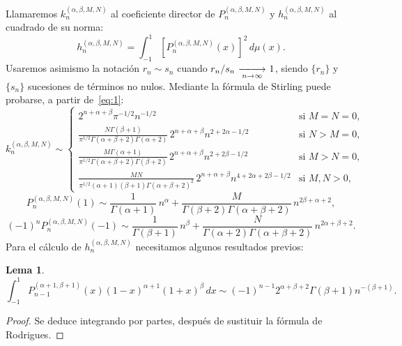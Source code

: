 \documentclass[a4paper]{article}
\newtheorem{lemma}{Lema}
\def\limtoenorme{\mathop{\,\relbar\joinrel\relbar\joinrel%
  \longrightarrow\,}\limits}
\begin{document}
Llamaremos $k^{(\alpha,\beta,M,N)}_{n}$ al 
coeficiente director de $P^{(\alpha,\beta,M,N)}_{n}$ 
y $h^{(\alpha,\beta,M,N)}_{n}$ al cuadrado 
de su norma:
$$
h^{(\alpha,\beta,M,N)}_{n}
= \int_{-1}^{1} [P^{(\alpha,\beta,M,N)}_{n}(x)]^{2}\,d\mu(x).
$$
Usaremos asimismo la notaci\'{o}n $r_{n} \sim s_{n}$ 
cuando $r_{n}/s_{n} \limtoenorme_{n\to\infty} 1$,
siendo $\{r_{n}\}$ y $\{s_{n}\}$ sucesiones de t\'{e}rminos no nulos. 
Mediante la f\'{o}rmula de Stirling puede probarse, a partir de~\eqref{eq:1}:
\begin{equation}
k^{(\alpha,\beta,M,N)}_{n} \sim 
\begin{cases}
2^{n+\alpha+\beta} \pi^{-1/2} n^{-1/2} &\text{si } M=N=0, \\[3pt]
\frac{N \Gamma(\beta+1)}{\pi^{1/2}\Gamma(\alpha+\beta+2)\Gamma(\alpha+2)} 
\, 2^{n+\alpha+\beta} n^{2+2\alpha-1/2} &\text{si } N>M=0, \\[4pt]
\frac{M \Gamma(\alpha+1)}{\pi^{1/2}\Gamma(\alpha+\beta+2)\Gamma(\beta+2)} 
\, 2^{n+\alpha+\beta} n^{2+2\beta-1/2} &\text{si } M>N=0, \\[3pt]
\frac{M N}{\pi^{1/2}(\alpha+1)(\beta+1)\Gamma(\alpha+\beta+2)^{2}} 
\, 2^{n+\alpha+\beta} n^{4+2\alpha+2\beta-1/2} &\text{si } M,N>0, 
\end{cases}
\label{eq:2}
\end{equation}
\begin{equation}
P^{(\alpha,\beta,M,N)}_{n}(1) \sim 
\frac{1}{\Gamma(\alpha+1)} \, n^{\alpha}
+ \frac{M}{\Gamma(\beta+2)\Gamma(\alpha+\beta+2)} \, n^{2\beta+\alpha+2},
\label{eq:3}
\end{equation}
\begin{equation}
(-1)^{n}P^{(\alpha,\beta,M,N)}_{n}(-1) \sim 
\frac{1}{\Gamma(\beta+1)} \, n^{\beta}
+ \frac{N}{\Gamma(\alpha+2)\Gamma(\alpha+\beta+2)} \, n^{2\alpha+\beta+2}.
\label{eq:4}
\end{equation}
Para el c\'{a}lculo de $h^{(\alpha,\beta,M,N)}_{n}$ 
necesitamos algunos resultados previos:

\begin{lemma}
\label{lem:1}
$$
\int_{-1}^{1} P^{(\alpha+1,\beta+1)}_{n-1}(x) (1-x)^{\alpha+1}(1+x)^{\beta} \,dx 
\sim (-1)^{n-1} 2^{\alpha+\beta+2} \Gamma(\beta+1) n^{-(\beta+1)}.
$$
\end{lemma}

\begin{proof}
Se deduce integrando por partes, despu\'{e}s 
de sustituir la f\'{o}rmula de Rodrigues.
\end{proof}
\end{document}
